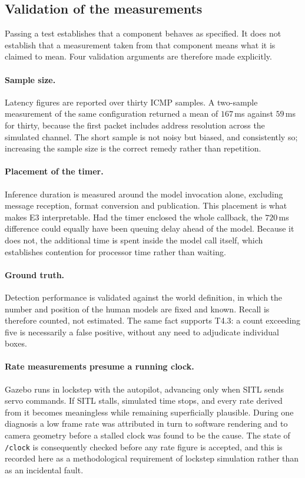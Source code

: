 \subsection{Validation of the measurements}
\label{sec:test-validation}

Passing a test establishes that a component behaves as specified. It does
not establish that a measurement taken from that component means what it is
claimed to mean. Four validation arguments are therefore made explicitly.

\paragraph{Sample size.}
Latency figures are reported over thirty ICMP samples. A two-sample
measurement of the same configuration returned a mean of $167$\,ms against
$59$\,ms for thirty, because the first packet includes address resolution
across the simulated channel. The short sample is not noisy but biased, and
consistently so; increasing the sample size is the correct remedy rather
than repetition.

\paragraph{Placement of the timer.}
Inference duration is measured around the model invocation alone, excluding
message reception, format conversion and publication. This placement is what
makes E3 interpretable. Had the timer enclosed the whole callback, the
$720$\,ms difference could equally have been queuing delay ahead of the
model. Because it does not, the additional time is spent inside the model
call itself, which establishes contention for processor time rather than
waiting.

\paragraph{Ground truth.}
Detection performance is validated against the world definition, in which
the number and position of the human models are fixed and known. Recall is
therefore counted, not estimated. The same fact supports T4.3: a count
exceeding five is necessarily a false positive, without any need to
adjudicate individual boxes.

\paragraph{Rate measurements presume a running clock.}
Gazebo runs in lockstep with the autopilot, advancing only when SITL sends
servo commands. If SITL stalls, simulated time stops, and every rate derived
from it becomes meaningless while remaining superficially plausible. During
one diagnosis a low frame rate was attributed in turn to software rendering
and to camera geometry before a stalled clock was found to be the cause.
The state of \texttt{/clock} is consequently checked before any rate figure
is accepted, and this is recorded here as a methodological requirement of
lockstep simulation rather than as an incidental fault.

